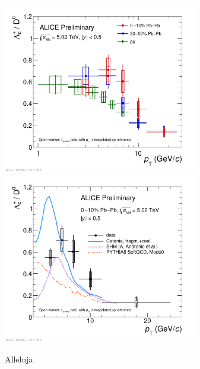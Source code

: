 \documentclass[3p,times,procedia]{elsarticle}
\begin{document}
\begin{figure}[h]
\includegraphics[width=8.5cm]{Plots/PbPbLc/2019-10-28-LcD_PbPb18_010_3050_pp_Logx_shift.pdf}
\includegraphics[width=8.5cm]{Plots/PbPbLc/2019-10-31-LcD_PbPb18_010_theory_withPythia.pdf}
\caption{Alleluja}
\label{fig:LcD0andtheory}
\end{figure}
\end{document}
